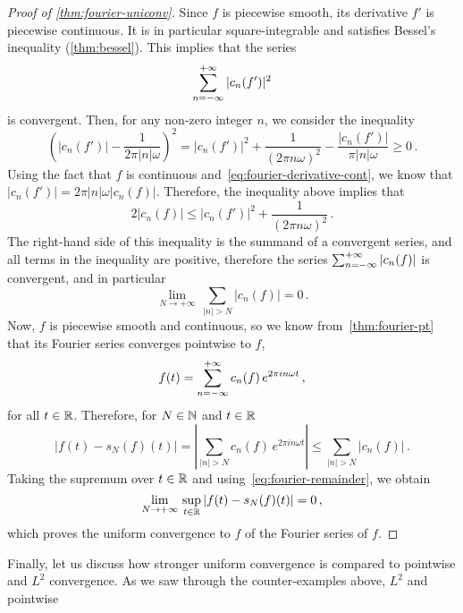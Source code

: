 \begin{proof}[Proof of \cref{thm:fourier-uniconv}]
  Since $f$ is piecewise smooth, its derivative $f'$ is piecewise continuous. It is in
  particular square-integrable and satisfies Bessel's inequality (\cref{thm:bessel}). This
  implies that the series
  \begin{equation}
    \sum_{n=-\infty}^{+\infty}|c_n(f')|^2
  \end{equation}
  is convergent. Then, for any non-zero integer $n$, we consider the inequality
  \begin{equation}
    \left(|c_n(f')|-\frac{1}{2\pi |n|\omega}\right)^2=|c_n(f')|^2
    +\frac{1}{(2\pi n\omega)^2}-\frac{|c_n(f')|}{\pi |n|\omega}\geq 0\,.
  \end{equation}
  Using the fact that $f$ is continuous and~\cref{eq:fourier-derivative-cont}, we know
  that $|c_n(f')|=2\pi|n|\omega |c_n(f)|$. Therefore, the inequality above implies that
  \begin{equation}
    2|c_n(f)|\leq |c_n(f')|^2
    +\frac{1}{(2\pi n\omega)^2}\,.
    \label{eq:fourier-remainder}
  \end{equation}
  The right-hand side of this inequality is the summand of a convergent series, and all
  terms in the inequality are positive, therefore the series $\sum_{n=-\infty}^{+\infty}|c_n(f)|$ is
  convergent, and in particular
  \begin{equation}
    \lim_{N\to+\infty}\,\sum_{|n|>N}|c_n(f)|=0\,.
  \end{equation}
  Now, $f$ is piecewise smooth and continuous, so we know from~\cref{thm:fourier-pt} that
  its Fourier series converges pointwise to $f$, \ie
  \begin{equation}
    f(t)=\sum_{n=-\infty}^{+\infty}c_n(f)\,e^{2\pi i n\omega t}\,,
  \end{equation}
  for all $t\in\mathbb{R}$. Therefore, for $N\in\mathbb{N}$ and $t\in\mathbb{R}$
  \begin{equation}
    |f(t)-s_N(f)(t)|=\left|\sum_{|n|>N}c_n(f)\,e^{2\pi i n\omega t}\right|
    \leq \sum_{|n|>N}|c_n(f)|\,.
  \end{equation}
  Taking the supremum over $t\in\mathbb{R}$ and using~\cref{eq:fourier-remainder}, we obtain
  \begin{equation}
    \lim_{N\to+\infty}\,\sup_{t\in\mathbb{R}}|f(t)-s_N(f)(t)|=0\,,
  \end{equation}
  which proves the uniform convergence to $f$ of the Fourier series of $f$.
\end{proof}
Finally, let us discuss how stronger uniform convergence is compared to pointwise and
$L^2$ convergence. As we saw through the counter-examples above, $L^2$ and pointwise
